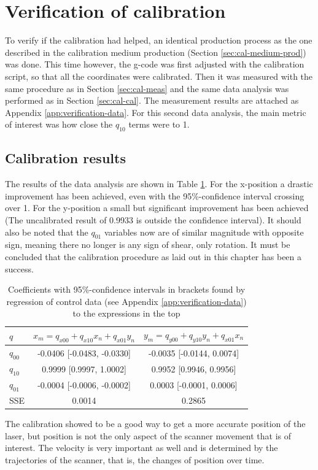 \section{Verification of calibration}

To verify if the calibration had helped, an identical production process as the one described in the calibration medium production (Section \ref{sec:cal-medium-prod}) was done. This time however, the g-code was first adjusted with the calibration script, so that all the coordinates were calibrated. Then it was measured with the same procedure as in Section \ref{sec:cal-meas} and the same data analysis was performed as in Section \ref{sec:cal-cal}. The measurement results are attached as Appendix \ref{app:verification-data}. For this second data analysis, the main metric of interest was how close the $q_{10}$ terms were to 1.

\subsection{Calibration results}

The results of the data analysis are shown in Table \ref{tab:cal-ver-fits}. For the x-position a drastic improvement has been achieved, even with the 95\%-confidence interval crossing over 1. For the y-position a small but significant improvement has been achieved (The uncalibrated result of 0.9933 is outside the confidence interval). It should also be noted that the $q_{01}$ variables now are of similar magnitude with opposite sign, meaning there no longer is any sign of shear, only rotation. It must be concluded that the calibration procedure as laid out in this chapter has been a success.

\begin{table}[ht]
    \centering
    \begin{tabular}{l|c|c}
        $q$ & 
        $x_m = q_{x00} + q_{x10}x_n + q_{x01}y_n$ & $y_m = q_{y00} + q_{y10}y_n + q_{x01}x_n$ \\
        \hline
        $q_{00}$ & -0.0406 [-0.0483, -0.0330] & -0.0035 [-0.0144, 0.0074]  \\
        $q_{10}$ & 0.9999 [0.9997, 1.0002] & 0.9952 [0.9946, 0.9956] \\
        $q_{01}$ & -0.0004 [-0.0006, -0.0002] & 0.0003 [-0.0001, 0.0006] \\
        SSE & 0.0014 & 0.2865
    \end{tabular}
    \caption{Coefficients with 95\%-confidence intervals in brackets found by regression of control data (see Appendix \ref{app:verification-data}) to the expressions in the top}
    \label{tab:cal-ver-fits}
\end{table}

The calibration showed to be a good way to get a more accurate position of the laser, but position is not the only aspect of the scanner movement that is of interest. The velocity is very important as well and is determined by the trajectories of the scanner, that is, the changes of position over time.


